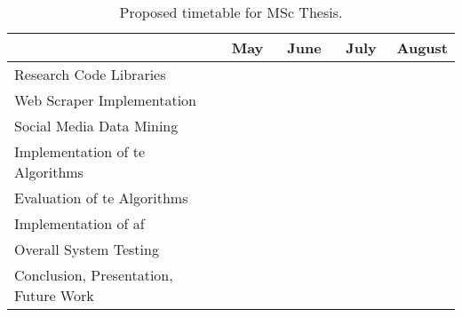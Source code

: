\begin{table}[!htbp]
    \centering
    \caption{Proposed timetable for MSc Thesis.}
    \begin{tabular}{|l|c|c|c|c|c|c|c|c|c|c|c|c|c|c|c|c|}
        \toprule
        & \multicolumn{4}{c|}{May} & \multicolumn{4}{c|}{June} & \multicolumn{4}{c|}{July} & \multicolumn{4}{c|}{August} \\ 
        \midrule
        
        Research Code Libraries & \multicolumn{2}{c|}{\cellcolor{brown}} & & & & & & & & & & & & & & \\
        \hline
        Web Scraper Implementation & & & \multicolumn{2}{c|}{\cellcolor{blue}} & & & & & & & & & & & & \\
        \hline
        
        Social Media Data Mining & & & & & \multicolumn{3}{c|}{\cellcolor{orange}} & & & & & & & & & \\
        \hline
        
        Implementation of \gls{te} Algorithms & & & & & & & & \multicolumn{2}{c|}{\cellcolor{green}} & & & & & & & \\
        \hline
        
        Evaluation of \gls{te} Algorithms & & & & & & & & & & \cellcolor{red} & & & & & & \\
        \hline
        
        Implementation of \gls{af} & & & & & & & & & & & \multicolumn{2}{c|}{\cellcolor{gray}} & & & & \\
        \hline
        
        Overall System Testing & & & & & & & & & & & & & \cellcolor{yellow} & & & \\
        \hline
        
        Conclusion, Presentation, Future Work & & & & & & & & & & & & & & \multicolumn{2}{c|}{\cellcolor{purple}} & \\
        \bottomrule
    \end{tabular}
    \label{table:timetable}
\end{table}